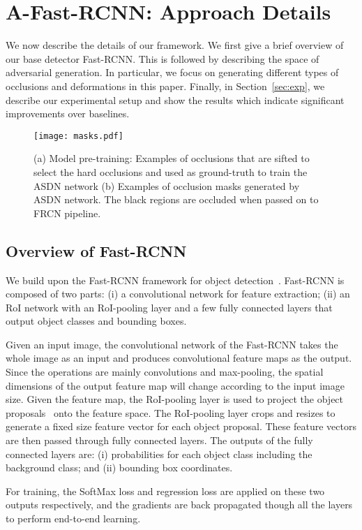 \documentclass[10pt,twocolumn,letterpaper]{article}
\begin{document}
 
\section{A-Fast-RCNN: Approach Details}
We now describe the details of our framework. We first give a brief overview of our base detector Fast-RCNN. This is followed by describing the space of adversarial generation. In particular, we focus on generating different types of occlusions and deformations in this paper. Finally, in Section~\ref{sec:exp}, we describe our experimental setup and show the results which indicate significant improvements over baselines.

\begin{figure*}
    \centering
    \texttt{[image: masks.pdf]}
    \caption{(a) Model pre-training: Examples of occlusions that are sifted to select the hard occlusions and used as ground-truth to train the ASDN network  (b) Examples of occlusion masks generated by ASDN network. The black regions are occluded when passed on to FRCN pipeline. }\label{fig:ASDN}
\end{figure*}

\subsection{Overview of Fast-RCNN}
We build upon the Fast-RCNN framework for object detection~\cite{frcn}. Fast-RCNN is composed of two parts: (i) a convolutional network for feature extraction; (ii) an RoI network with an  RoI-pooling layer and a few fully connected layers that output object classes and bounding boxes. 

Given an input image, the convolutional network of the Fast-RCNN takes the whole image as an input and produces convolutional feature maps as the output. Since the operations are mainly convolutions and max-pooling, the spatial dimensions of the output feature map will change according to the input image size. Given the feature map, the RoI-pooling layer is used to project the object proposals~\cite{Uijlings13} onto the feature space. The RoI-pooling layer crops and resizes to generate a fixed size feature vector for each object proposal. These feature vectors are then passed through fully connected layers. The outputs of the fully connected layers are: (i) probabilities for each object class including the background class; and (ii) bounding box coordinates. 

For training, the SoftMax loss and regression loss are applied on these two outputs respectively, and the gradients are back propagated  though all the layers to perform end-to-end learning.
\end{document}
